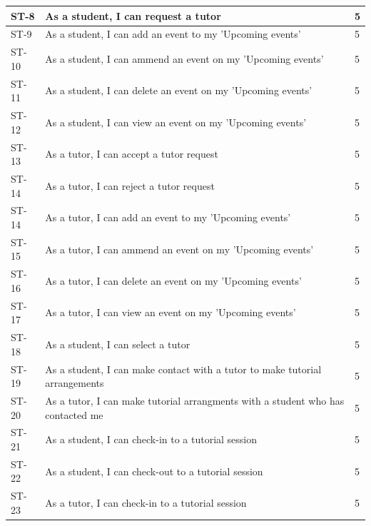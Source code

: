 \documentclass[12pt]{article}
\begin{document}
{{\begin{longtable}{| l | p{10cm}| l |}
			\\ \hline ST-8 & As a student, I can  request a tutor  & 5
			\\ \hline ST-9 & As a student, I can  add an event to my 'Upcoming events'  & 5

			\\ \hline ST-10 & As a student, I can  ammend an event on my 'Upcoming events'  & 5

			\\ \hline ST-11 & As a student, I can  delete an event on my 'Upcoming events'  & 5

			\\ \hline ST-12 & As a student, I can  view an event on my 'Upcoming events'  & 5

			\\ \hline ST-13 & As a tutor, I can  accept a tutor request  & 5

						\\ \hline ST-14 & As a tutor, I can  reject a tutor request  & 5

			\\ \hline ST-14 & As a tutor, I can  add an event to my 'Upcoming events'  & 5

			\\ \hline ST-15 & As a tutor, I can  ammend an event on my 'Upcoming events'  & 5

			\\ \hline ST-16 & As a tutor, I can  delete an event on my 'Upcoming events'  & 5

			\\ \hline ST-17 & As a tutor, I can  view an event on my 'Upcoming events'  & 5

			\\ \hline ST-18 & As a student, I can  select a tutor  & 5

			\\ \hline ST-19 & As a student, I can  make contact with a tutor to make tutorial arrangements  & 5

			\\ \hline ST-20 & As a tutor, I can  make tutorial arrangments with a student who has contacted me  & 5

			\\ \hline ST-21 & As a student, I can  check-in to a tutorial session  & 5

			\\ \hline ST-22 & As a student, I can  check-out to a tutorial session  & 5

			\\ \hline ST-23 & As a tutor, I can  check-in to a tutorial session  & 5


\end{longtable}}}
\end{document}
